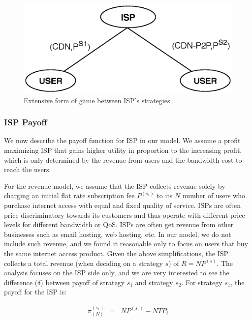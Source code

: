 \documentclass[paper]{ieice}
\begin{document}
\begin{figure}[tb] 
\begin{center}
\includegraphics[scale=0.5]{graphs/game-tree-2.eps}
\end{center}
\caption{Extensive form of game between ISP's strategies}
\label{fig:gametree}
\vspace{-2mm}
\end{figure}

\subsubsection{ISP Payoff}

We now describe the payoff function for ISP in our model.  
We assume a profit maximizing ISP that gains higher utility in proportion to the increasing profit, which is only determined by the revenue from users and the bandwidth cost to reach the users.

For the revenue model, we assume that the ISP collects revenue solely by charging an initial flat rate subscription fee $P^{(s_1)}$ to its $N$ number of users who purchase internet access with equal and fixed quality of service.
ISPs are often price discriminatory towards its customers and thus operate with different price levels for different bandwidth or QoS.
ISPs are often get revenue from other businesses such as email hosting, web hosting, etc. 
In our model, we do not include such revenue, and we found it reasonable only to focus on users that buy the same internet access product. 
Given the above simplifications, the ISP collects a total revenue (when deciding on a strategy $s$) of $R = N P^{(s)}$.
The analysis focuses on the ISP side only, and we are very interested to see the difference ($\delta$) between payoff of strategy $s_1$ and strategy $s_2$.
For strategy $s_1$, the payoff for the ISP is: 

\begin{eqnarray}
	\pi^{(s_1)}_{(N)}&=& N P^{(s_1)} - N T P_t\\
\end{eqnarray}
\end{document}
